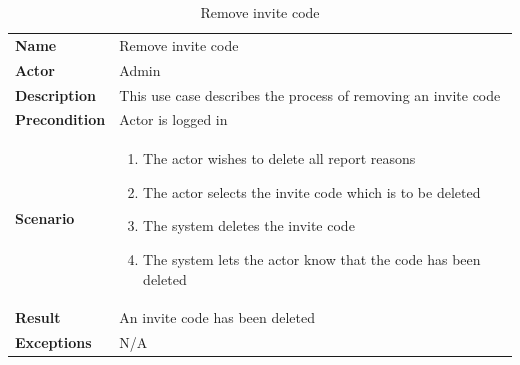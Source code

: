 \begin{table}[ht]
    \caption{Remove invite code}
    \begin{tabular}{|L{5cm}|L{10cm}|}
        \toprule
        \textbf{Name}         & Remove invite code                                             \\
        \textbf{Actor}        & Admin                                                          \\
        \textbf{Description}  & This use case describes the process of removing an invite code \\
        \textbf{Precondition} & Actor is logged in                                             \\
        \textbf{Scenario} &
        \vspace{-0.75cm}
        \begin{enumerate}
            \setlength\itemsep{-0.5em}
            \item The actor wishes to delete all report reasons
            \item The actor selects the invite code which is to be deleted
            \item The system deletes the invite code
            \item The system lets the actor know that the code has been deleted
        \end{enumerate} \\[-0.5cm]
        \textbf{Result}       & An invite code has been deleted                                \\
        \textbf{Exceptions}   & N/A                                                            \\
        \bottomrule
    \end{tabular}
    \label{tab:table32}
\end{table}

